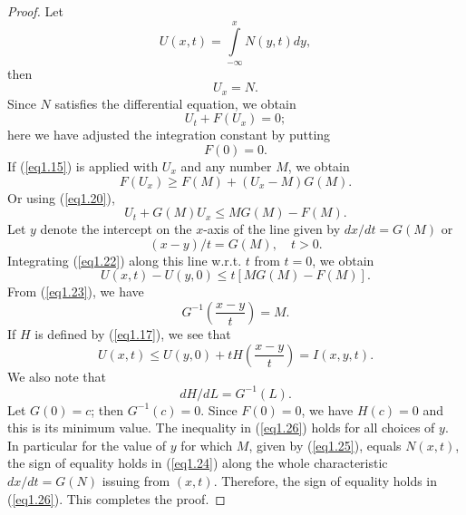 \begin{proof}
Let\pageoriginale
 \begin{equation*}
U (x,t) = \int\limits^{x}_{-\infty} N (y,t) dy,  \tag{1.18}\label{eq1.18}
 \end{equation*}
then 
\begin{equation*}
U_x = N. \tag{1.19}\label{eq1.19}
\end{equation*}
Since $N$ satisfies the differential equation, we obtain
\begin{equation*}
U_t + F (U_x) = 0; \tag{1.20}\label{eq1.20}
\end{equation*}
here we have adjusted the integration constant by putting 
\begin{equation*}
F(0) = 0. \tag{1.21}\label{eq1.21}
\end{equation*}
If (\ref{eq1.15}) is applied with $U_x$ and any number $M$, we obtain 
$$
F(U_x) \geq F (M) + (U_x -M) G(M). 
$$
Or using (\ref{eq1.20}),
\begin{equation*}
U_t + G(M) U_x \leq MG(M) - F(M).\tag{1.22}\label{eq1.22}
\end{equation*}
Let $y$ denote the intercept on the $x$-axis of the line given by $dx/dt = G(M)$ or
\begin{equation*}
(x-y)/t = G(M), \quad t > 0. \tag{1.23}\label{eq1.23}
\end{equation*}
Integrating (\ref{eq1.22}) along this line w.r.t. $t$ from $t=0$, we obtain
\begin{equation*}
U (x,t) - U(y,0) \leq t [MG(M) - F(M)]. \tag{1.24}\label{eq1.24}
\end{equation*}
From (\ref{eq1.23}), we have 
\begin{equation*}
G^{-1} (\frac{x-y}{t}) = M. \tag{1.25}\label{eq1.25}
\end{equation*}
If $H$ is defined by (\ref{eq1.17}), we see that 
\begin{equation*}
U(x,t) \leq U (y,0) + t H (\frac{x-y}{t}) = I (x,y,t). \tag{1.26}\label{eq1.26}
\end{equation*}\pageoriginale
We also note that 
$$
dH/ dL = G^{-1} (L). 
$$
Let $G(0) = c$; then $G^{-1} (c) = 0$. Since $F(0) = 0$, we have $H(c) =0$ and this is its minimum value. The inequality in (\ref{eq1.26}) holds for all choices of $y$. In particular for the value of $y$ for which $M$, given by (\ref{eq1.25}), equals $N(x,t)$, the sign of equality holds in (\ref{eq1.24}) along the whole characteristic $dx/dt = G(N)$ issuing from $(x,t)$. Therefore, the sign of equality holds in (\ref{eq1.26}). This completes the proof.
\end{proof}

